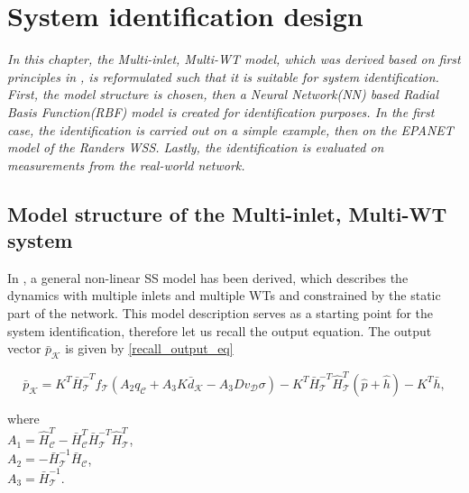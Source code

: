 \chapter{System identification design}
\label{identification_design}

\emph{In this chapter, the Multi-inlet, Multi-WT model, which was derived based on first principles in , is reformulated such that it is suitable for system identification. First, the model structure is chosen, then a Neural Network(NN) based Radial Basis Function(RBF) model is created for identification purposes. In the first case, the identification is carried out on a simple example, then on the EPANET model of the Randers WSS. Lastly, the identification is evaluated on measurements from the real-world network.}

\section{Model structure of the Multi-inlet, Multi-WT system}
\label{model_structure_of_the_multi_inlet_multi_WT_system}

In , a general non-linear SS model has been derived, which describes the dynamics with multiple inlets and multiple WTs and constrained by the static part of the network. This model description serves as a starting point for the system identification, therefore let us recall the output equation. The output vector $\bar{p}_{\mathcal{K}}$ is given by \eqref{recall_output_eq}

\begin{equation}
  \label{recall_output_eq}
  \bar{p}_{\mathcal{K}} = K^T \bar{H}^{-T}_{\mathcal{T}}f_{\mathcal{T}}(A_2 q_\mathcal{C} + A_3 K \bar{d}_{\mathcal{K}} - A_3 D v_{\mathcal{D}} \sigma) - K^T\bar{H}^{-T}_{\mathcal{T}}\hat{H}^{T}_{\mathcal{T}} (\hat{p} + \hat{h}) - K^T\bar{h} ,
\end{equation} 

\begin{minipage}[t]{0.4\textwidth}
where\\
\hspace*{8mm} $A_1 = \hat{H}^T_{\mathcal{C}} -\bar{H}^T_{\mathcal{C}}\bar{H}^{-T}_{\mathcal{T}}\hat{H}^T_{\mathcal{T}}$, \vspace*{1.5mm}  \\
\hspace*{8mm} $A_2 = -\bar{H}^{-1}_{\mathcal{T}} \bar{H}_{\mathcal{C}} $, \vspace*{1.5mm}\\
\hspace*{8mm} $A_3 = \bar{H}^{-1}_{\mathcal{T}}$.
\end{minipage}

